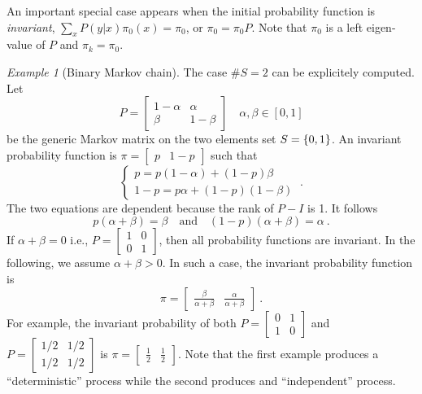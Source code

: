 \documentclass[12pt,a4paper]{amsart}
\theoremstyle{plain}%
\theoremstyle{definition}
\theoremstyle{remark}
\newtheorem{example}{Example}
\begin{document}
An important special case appears when the initial probability function is \emph{invariant}, $\sum_{x} P(y|x) \pi_0(x) = \pi_0$, or $\pi_0 = \pi_0 P$. Note that $\pi_0$ is a left eigen-value of $P$ and $\pi_k = \pi_0$.

\begin{example}[Binary Markov chain] The case $\# S = 2$ can be
  explicitely computed. Let
\begin{equation*}
  P = \begin{bmatrix} 1-\alpha & \alpha \\ \beta & 1-\beta
  \end{bmatrix}  \quad \alpha,\beta \in [0,1]
\end{equation*}
be the generic Markov matrix on the two elements set $S=\left\{0,1\right\}$. An invariant probability function is $\pi =
\begin{bmatrix}
  p & 1-p
\end{bmatrix}$
such that
\begin{equation*}
  \begin{cases}
    p = p(1-\alpha) + (1-p)\beta \\ 1-p = p\alpha + (1-p)(1-\beta)
  \end{cases} \ .
\end{equation*}
The two equations are dependent because the rank of $P-I$ is 1. It follows
\begin{equation*}
  p(\alpha+\beta) = \beta \quad \text{and} \quad (1-p)(\alpha+\beta) = \alpha \ .
\end{equation*}
If $\alpha+\beta=0$ i.e., $P=
\begin{bmatrix}
  1 & 0 \\ 0 & 1
\end{bmatrix}$, then all probability functions are invariant. In the following, we assume $\alpha+\beta > 0$. In such a case, the invariant probability function is
\begin{equation*}
  \pi =
  \begin{bmatrix}
    \frac \beta {\alpha+\beta} & \frac \alpha {\alpha+\beta}
  \end{bmatrix} \ .
\end{equation*}
For example, the invariant probability of both $P =
\begin{bmatrix}
  0 & 1 \\ 1 & 0
\end{bmatrix}$ and $P =
\begin{bmatrix}
  1/2 & 1/2 \\ 1/2 & 1/2
\end{bmatrix}$
is $\pi =
\begin{bmatrix}
  \frac12 & \frac12
\end{bmatrix}$.
Note that the first example produces a ``deterministic'' process while the second produces and ``independent'' process.


\end{example}
\end{document}
